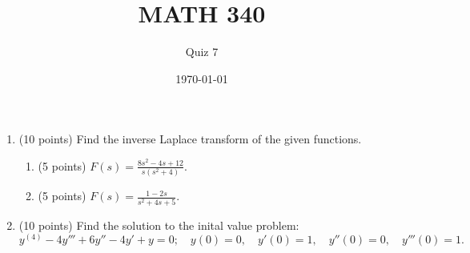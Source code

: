 \documentclass{article}
\begin{document}
\title{MATH 340}
\author{Quiz 7}
\date{\today}
\maketitle

\begin{enumerate}
	\item (10 points) Find the inverse Laplace transform of the given functions.
		\begin{enumerate}
			\item (5 points) $F(s)=\frac{8s^2-4s+12}{s(s^2+4)}$.
			\item (5 points) $F(s)=\frac{1-2s}{s^2+4s+5}$.
		\end{enumerate}
	\item (10 points) Find the solution to the inital value problem:
	\[
		y^{(4)} - 4y''' + 6y'' -4y' + y=0;\quad y(0)=0, \quad y'(0)=1, \quad y''(0)=0, \quad y'''(0)=1.
	\]
\end{enumerate}
\end{document}
